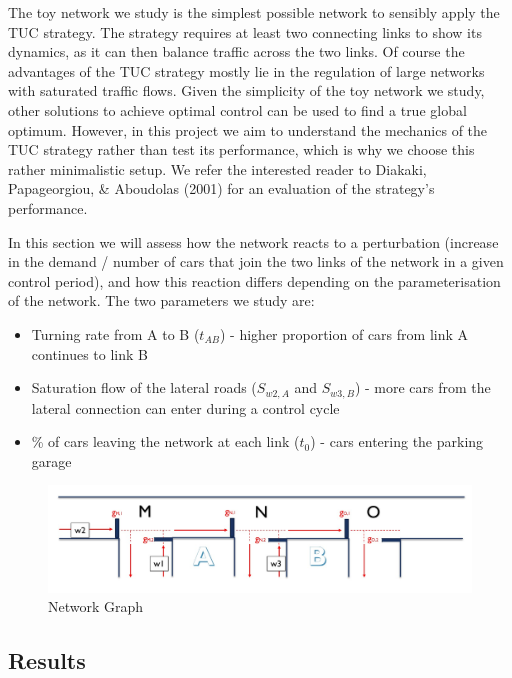 \documentclass[11pt]{article}
\begin{document}
The toy network we study is the simplest possible network to sensibly apply the TUC strategy. The strategy requires at least two connecting links to show its dynamics, as it can then balance traffic across the two links. Of course the advantages of the TUC strategy mostly lie in the regulation of large networks with saturated traffic flows. Given the simplicity of the toy network we study, other solutions to achieve optimal control can be used to find a true global optimum. However, in this project we aim to understand the mechanics of the TUC strategy rather than test its performance, which is why we choose this rather minimalistic setup. We refer the interested reader to Diakaki, Papageorgiou, \& Aboudolas (2001) for an evaluation of the strategy's performance.

In this section we will assess how the network reacts to a perturbation (increase in the demand / number of cars that join the two links of the network in a given control period), and how this reaction differs depending on the parameterisation of the network. The two parameters we study are:

\begin{itemize}
\item Turning rate from A to B ($t_{AB}$) - higher proportion of cars from link A continues to link B
\item Saturation flow of the lateral roads ($S_{w2,A}$ and $S_{w3,B}$) - more cars from the lateral connection can enter during a control cycle
\item \% of cars leaving the network at each link ($t_0$) - cars entering the parking garage
\end{itemize}


\begin{figure}[h!]
    \caption{Network Graph}
      \centering
	\includegraphics[width=18cm]{network-graph}
\end{figure}

\subsection{Results}
\end{document}
